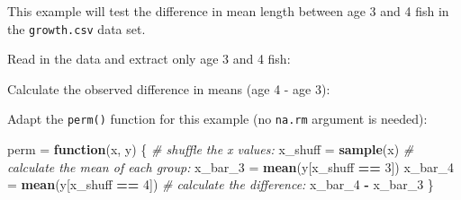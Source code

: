 \documentclass[]{book}
\newenvironment{Shaded}{\begin{snugshade}}{\end{snugshade}}
\newcommand{\KeywordTok}[1]{\textcolor[rgb]{0.13,0.29,0.53}{\textbf{#1}}}
\newcommand{\DecValTok}[1]{\textcolor[rgb]{0.00,0.00,0.81}{#1}}
\newcommand{\StringTok}[1]{\textcolor[rgb]{0.31,0.60,0.02}{#1}}
\newcommand{\CommentTok}[1]{\textcolor[rgb]{0.56,0.35,0.01}{\textit{#1}}}
\newcommand{\ControlFlowTok}[1]{\textcolor[rgb]{0.13,0.29,0.53}{\textbf{#1}}}
\newcommand{\OperatorTok}[1]{\textcolor[rgb]{0.81,0.36,0.00}{\textbf{#1}}}
\newcommand{\NormalTok}[1]{#1}
\theoremstyle{definition}
\theoremstyle{definition}
\theoremstyle{definition}
\theoremstyle{remark}
\begin{document}
This example will test the difference in mean length between age 3 and 4
fish in the \texttt{growth.csv} data set.

Read in the data and extract only age 3 and 4 fish:

\begin{Shaded}
\end{Shaded}

Calculate the observed difference in means (age 4 - age 3):

\begin{Shaded}
\end{Shaded}

Adapt the \texttt{perm()} function for this example (no \texttt{na.rm}
argument is needed):

\begin{Shaded}
\begin{Highlighting}[]
\NormalTok{perm =}\StringTok{ }\ControlFlowTok{function}\NormalTok{(x, y) \{}
  \CommentTok{# shuffle the x values:}
\NormalTok{  x_shuff =}\StringTok{ }\KeywordTok{sample}\NormalTok{(x)}
  \CommentTok{# calculate the mean of each group:}
\NormalTok{  x_bar_}\DecValTok{3}\NormalTok{ =}\StringTok{ }\KeywordTok{mean}\NormalTok{(y[x_shuff }\OperatorTok{==}\StringTok{ }\DecValTok{3}\NormalTok{])}
\NormalTok{  x_bar_}\DecValTok{4}\NormalTok{ =}\StringTok{ }\KeywordTok{mean}\NormalTok{(y[x_shuff }\OperatorTok{==}\StringTok{ }\DecValTok{4}\NormalTok{])}
  \CommentTok{# calculate the difference:}
\NormalTok{  x_bar_}\DecValTok{4} \OperatorTok{-}\StringTok{ }\NormalTok{x_bar_}\DecValTok{3}
\NormalTok{\}}
\end{Highlighting}
\end{Shaded}
\end{document}

